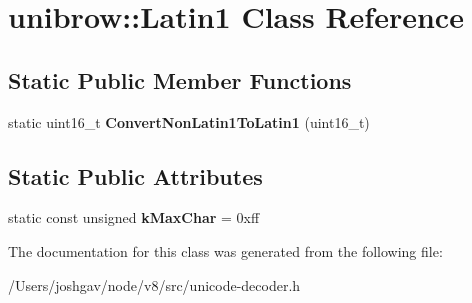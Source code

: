\hypertarget{classunibrow_1_1_latin1}{}\section{unibrow\+:\+:Latin1 Class Reference}
\label{classunibrow_1_1_latin1}
\subsection*{Static Public Member Functions}
\begin{DoxyCompactItemize}
\item 
static uint16\+\_\+t {\bfseries Convert\+Non\+Latin1\+To\+Latin1} (uint16\+\_\+t)\hypertarget{classunibrow_1_1_latin1_af5bb91c291f7f54168bd749499b24ed3}{}\label{classunibrow_1_1_latin1_af5bb91c291f7f54168bd749499b24ed3}

\end{DoxyCompactItemize}
\subsection*{Static Public Attributes}
\begin{DoxyCompactItemize}
\item 
static const unsigned {\bfseries k\+Max\+Char} = 0xff\hypertarget{classunibrow_1_1_latin1_aa184fb4edf2b3decc925d3968febe65e}{}\label{classunibrow_1_1_latin1_aa184fb4edf2b3decc925d3968febe65e}

\end{DoxyCompactItemize}


The documentation for this class was generated from the following file\+:\begin{DoxyCompactItemize}
\item 
/\+Users/joshgav/node/v8/src/unicode-\/decoder.\+h\end{DoxyCompactItemize}

